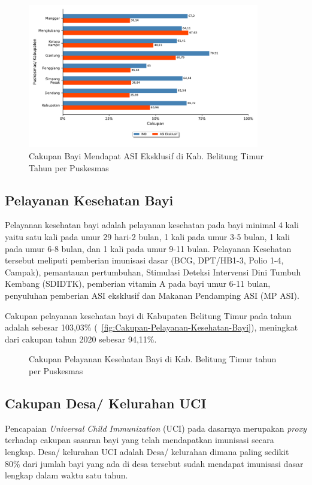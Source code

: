 \begin{figure}[H]
  \centering
  \includegraphics[width=0.9\textwidth]{bab_05/bab_05_15_ASIeksklusif}
  \caption{Cakupan Bayi Mendapat ASI Eksklusif di Kab. Belitung Timur Tahun \tP per Puskesmas}
  \label{fig:Cakupan-Bayi-ASI-Eksklusif}
\end{figure}

\subsection{Pelayanan Kesehatan Bayi}
Pelayanan kesehatan bayi adalah pelayanan kesehatan pada bayi minimal
4 kali yaitu satu kali pada umur 29 hari-2 bulan, 1 kali pada umur
3-5 bulan, 1 kali pada umur 6-8 bulan, dan 1 kali pada umur 9-11 bulan.
Pelayanan Kesehatan tersebut meliputi pemberian imunisasi dasar (BCG,
DPT/HB1-3, Polio 1-4, Campak), pemantauan pertumbuhan, Stimulasi Deteksi
Intervensi Dini Tumbuh Kembang (SDIDTK), pemberian vitamin A pada
bayi umur 6-11 bulan, penyuluhan pemberian ASI eksklusif dan Makanan
Pendamping ASI (MP ASI).

Cakupan pelayanan kesehatan bayi di Kabupaten Belitung Timur pada
tahun \tP adalah sebesar 103,03\% (~\autoref{fig:Cakupan-Pelayanan-Kesehatan-Bayi}), meningkat dari cakupan tahun 2020
sebesar 94,11\%.

\begin{figure}[H]
    \centering
    \caption{Cakupan Pelayanan Kesehatan Bayi di Kab. Belitung Timur tahun \tP per Puskesmas}
    \label{fig:Cakupan-Pelayanan-Kesehatan-Bayi}
\end{figure}

\subsection{Cakupan Desa/ Kelurahan UCI}
Pencapaian \emph{Universal Child Immunization} (UCI) pada dasarnya merupakan
\emph{proxy} terhadap cakupan sasaran bayi yang telah mendapatkan imunisasi
secara lengkap. Desa/ kelurahan UCI adalah Desa/ kelurahan dimana
paling sedikit 80\% dari jumlah bayi yang ada di desa tersebut sudah
mendapat imunisasi dasar lengkap dalam waktu satu tahun.


